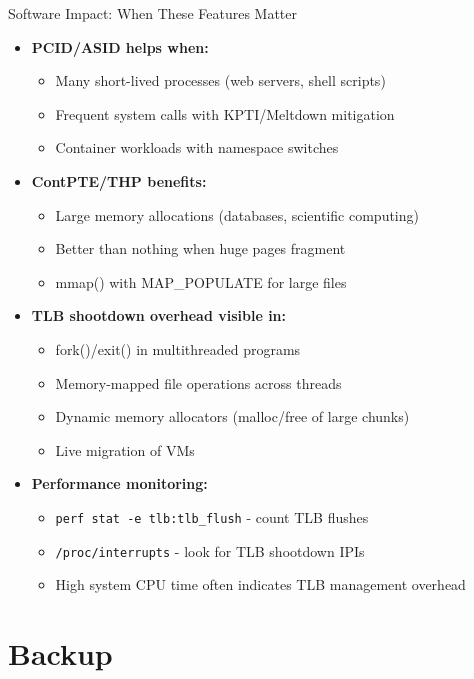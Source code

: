 \documentclass[aspectratio=169,12pt]{beamer}
\begin{document}
\begin{frame}{Software Impact: When These Features Matter}
\begin{itemize}
\item \textbf{PCID/ASID helps when:}
    \begin{itemize}
    \item Many short-lived processes (web servers, shell scripts)
    \item Frequent system calls with KPTI/Meltdown mitigation
    \item Container workloads with namespace switches
    \end{itemize}
    
\item \textbf{ContPTE/THP benefits:}
    \begin{itemize}
    \item Large memory allocations (databases, scientific computing)
    \item Better than nothing when huge pages fragment
    \item mmap() with MAP\_POPULATE for large files
    \end{itemize}
    
\item \textbf{TLB shootdown overhead visible in:}
    \begin{itemize}
    \item fork()/exit() in multithreaded programs
    \item Memory-mapped file operations across threads
    \item Dynamic memory allocators (malloc/free of large chunks)
    \item Live migration of VMs
    \end{itemize}
    
\item \textbf{Performance monitoring:}
    \begin{itemize}
    \item \texttt{perf stat -e tlb:tlb\_flush} - count TLB flushes
    \item \texttt{/proc/interrupts} - look for TLB shootdown IPIs
    \item High system CPU time often indicates TLB management overhead
    \end{itemize}
\end{itemize}
\end{frame}

\section{Backup}
\end{document}
